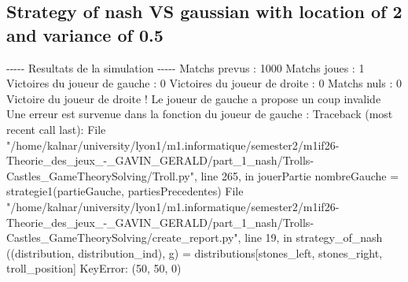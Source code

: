 \documentclass{article}%
\begin{document}
%
\subsection{Strategy of nash VS gaussian with location of 2 and variance of 0.5}%
\label{subsec:Strategy of nash VS gaussian with location of 2 and variance of 0.5}%
{-}{-}{-}{-}{-} Resultats de la simulation {-}{-}{-}{-}{-}\newline%
		\newline%
Matchs prevus : 1000\newline%
Matchs joues : 1\newline%
\newline%
Victoires du joueur de gauche : 0\newline%
Victoires du joueur de droite : 0\newline%
Matchs nuls : 0\newline%
\newline%
Victoire du joueur de droite ! Le joueur de gauche a propose un coup invalide\newline%
Une erreur est survenue dans la fonction du joueur de gauche : \newline%
Traceback (most recent call last):\newline%
  File "/home/kalnar/university/lyon1/m1.informatique/semester2/m1if26{-}Theorie\_des\_jeux\_{-}\_GAVIN\_GERALD/part\_1\_nash/Trolls{-}Castles\_GameTheorySolving/Troll.py", line 265, in jouerPartie\newline%
    nombreGauche = strategie1(partieGauche, partiesPrecedentes)\newline%
  File "/home/kalnar/university/lyon1/m1.informatique/semester2/m1if26{-}Theorie\_des\_jeux\_{-}\_GAVIN\_GERALD/part\_1\_nash/Trolls{-}Castles\_GameTheorySolving/create\_report.py", line 19, in strategy\_of\_nash\newline%
    ((distribution, distribution\_ind), g) = distributions{[}stones\_left, stones\_right, troll\_position{]}\newline%
KeyError: (50, 50, 0)\newline%

%
\end{document}
